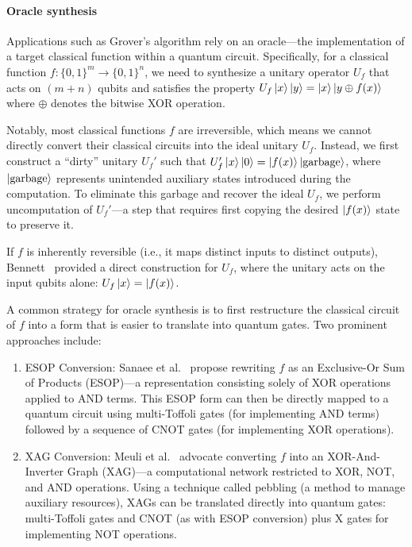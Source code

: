 \documentclass[a4paper,onecolumn,11pt,unpublished]{quantumarticle}
\begin{document}
\paragraph{Oracle synthesis}
Applications such as Grover's algorithm rely on an oracle---the implementation of a target classical function within a quantum circuit. Specifically, for a classical function $f: \{0, 1\}^m \rightarrow \{0, 1\}^n$, we need to synthesize a unitary operator $U_f$ that acts on $(m+n)$ qubits and satisfies the property $U_f\ket{x}\ket{y} = \ket{x}\ket{y \oplus f(x)}$  where $\oplus$ denotes the bitwise XOR operation.  

Notably, most classical functions $f$ are irreversible, which means we cannot directly convert their classical circuits into the ideal unitary $U_f$. Instead, we first construct a ``dirty'' unitary $U_f'$ such that $U_f'\ket{x}\ket{0} = \ket{f(x)}\ket{\text{garbage}}$,  
where $\ket{\text{garbage}}$ represents unintended auxiliary states introduced during the computation. To eliminate this garbage and recover the ideal $U_f$, we perform uncomputation of $U_f'$---a step that requires first copying the desired $\ket{f(x)}$ state to preserve it.  

If $f$ is inherently reversible (i.e., it maps distinct inputs to distinct outputs), Bennett~\cite{bennettLogicalReversibilityComputation1973} provided a direct construction for $U_f$, where the unitary acts on the input qubits alone: $U_f\ket{x} = \ket{f(x)}$.  

A common strategy for oracle synthesis is to first restructure the classical circuit of \( f \) into a form that is easier to translate into quantum gates. Two prominent approaches include:  
\begin{enumerate}
\item ESOP Conversion: Sanaee et al.~\cite{sanaeeESOPBasedToffoliNetwork2010} propose rewriting $f$ as an Exclusive-Or Sum of Products (ESOP)---a representation consisting solely of XOR operations applied to AND terms. This ESOP form can then be directly mapped to a quantum circuit using multi-Toffoli gates (for implementing AND terms) followed by a sequence of CNOT gates (for implementing XOR operations).  
\item XAG Conversion: Meuli et al.~\cite{meuliXorAndInverterGraphsQuantum2022} advocate converting $f$ into an XOR-And-Inverter Graph (XAG)---a computational network restricted to XOR, NOT, and AND operations. Using a technique called pebbling (a method to manage auxiliary resources), XAGs can be translated directly into quantum gates: multi-Toffoli gates and CNOT (as with ESOP conversion) plus X gates for implementing NOT operations.
\end{enumerate}
\end{document}
